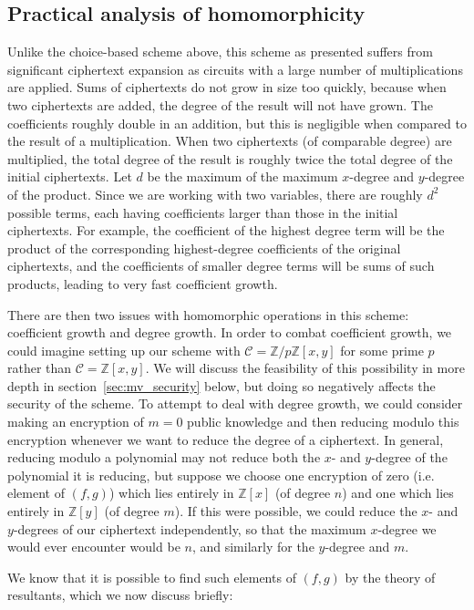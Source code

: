 \documentclass[11pt]{report}
\newcommand{\Zx}{\mathbb{Z}[x]}
\newcommand{\Zy}{\mathbb{Z}[y]}
\newcommand{\Zxy}{\mathbb{Z}[x,y]}
\newcommand{\Zpxy}{\mathbb{Z}/p\mathbb{Z}[x,y]}
\begin{document}
\subsection{Practical analysis of homomorphicity}
\label{sec:mv_hom_analysis}
Unlike the choice-based scheme above, this scheme as presented suffers from significant ciphertext expansion as circuits with a large number of multiplications are applied. Sums of ciphertexts do not grow in size too quickly, because when two ciphertexts are added, the degree of the result will not have grown. The coefficients roughly double in an addition, but this is negligible when compared to the result of a multiplication. When two ciphertexts (of comparable degree) are multiplied, the total degree of the result is roughly twice the total degree of the initial ciphertexts. Let $d$ be the maximum of the maximum $x$-degree and $y$-degree of the product. Since we are working with two variables, there are roughly $d^2$ possible terms, each having coefficients larger than those in the initial ciphertexts. For example, the coefficient of the highest degree term will be the product of the corresponding highest-degree coefficients of the original ciphertexts, and the coefficients of smaller degree terms will be sums of such products, leading to very fast coefficient growth.

There are then two issues with homomorphic operations in this scheme: coefficient growth and degree growth. In order to combat coefficient growth, we could imagine setting up our scheme with $\mathcal{C} = \Zpxy$ for some prime $p$ rather than $\mathcal{C} = \Zxy$. We will discuss the feasibility of this possibility in more depth in section~\ref{sec:mv_security} below, but doing so negatively affects the security of the scheme. To attempt to deal with degree growth, we could consider making an encryption of $m=0$ public knowledge and then reducing modulo this encryption whenever we want to reduce the degree of a ciphertext. In general, reducing modulo a polynomial may not reduce both the $x$- and $y$-degree of the polynomial it is reducing, but suppose we choose one encryption of zero (i.e. element of $(f,g)$) which lies entirely in $\Zx$ (of degree $n$) and one which lies entirely in $\Zy$ (of degree $m$). If this were possible, we could reduce the $x$- and $y$-degrees of our ciphertext independently, so that the maximum $x$-degree we would ever encounter would be $n$, and similarly for the $y$-degree and $m$.

We know that it is possible to find such elements of $(f,g)$ by the theory of resultants, which we now discuss briefly:
\end{document}
